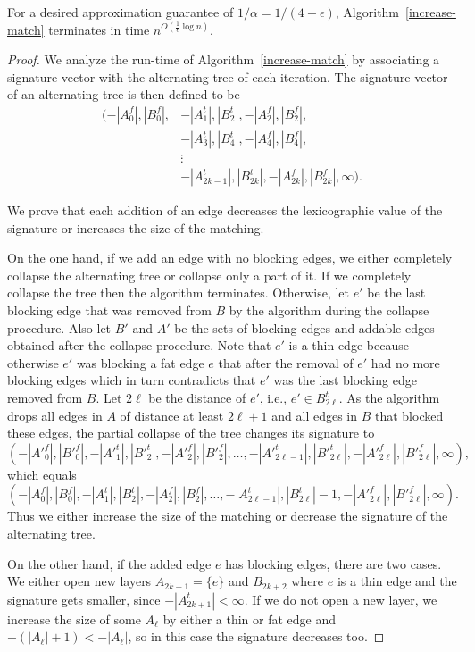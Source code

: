 \documentclass{llncs}
\begin{document}
\begin{lemma}
\label{lemma:termination}
For a desired approximation guarantee of $1/\alpha = 1/(4+\epsilon)$, Algorithm~\ref{increase-match} terminates in time
$n^{O\left(\frac{1}{\epsilon}\log n\right)}$.\end{lemma}
\begin{proof}
We analyze the run-time of Algorithm~\ref{increase-match} by
associating a signature vector with the alternating tree of each
iteration. The signature vector of an alternating tree is then defined to be
\begin{align*}
( -|A^f_0|, |B^f_0|, &-|A^t_1|, |B^t_2|,  -|A^f_2|, |B^f_2|, \\
&-|A^t_3|, |B^t_4|,  -|A^f_4|, |B^f_4|, \\
&  \vdots \\
& -|A^t_{2k-1}|, |B^t_{2k}|,  -|A^f_{2k}|, |B^f_{2k}|, \infty).
\end{align*}

We prove that each addition of an edge decreases the lexicographic value of
the signature or increases the size of the matching.

On the one hand, if we add an edge with no blocking edges, we either completely
collapse the alternating tree or collapse only a part of it.
If we completely collapse the tree then the algorithm terminates. Otherwise, let
$e'$ be the last blocking edge that was removed from $B$ by the algorithm during
the collapse procedure. Also let $B'$ and $A'$ be the sets of  blocking edges
and addable edges obtained after the collapse procedure. Note that $e'$ is a
thin edge because otherwise $e'$ was blocking a fat edge $e$ that after the
removal of $e'$ had no more blocking edges which in turn contradicts that $e'$
was the last blocking edge removed from $B$. Let $2\ell$ be the distance of
$e'$, i.e., $e' \in B^t_{2\ell}$. As the algorithm drops all edges in $A$ of
distance at least $2 \ell+1$ and all edges in $B$ that  blocked these edges, the
partial collapse of the tree changes its 
signature to $$( -|A'^f_0|, |B'^f_0|, -|A'^t_1|, |B'^t_2|,  -|A'^f_2|, |B'^f_2|, \dots, -|A'^t_{2\ell-1}|,
|B'^t_{2\ell}|,  -|A'^f_{2\ell}|, |B'^f_{2\ell}|, \infty),$$ which equals
$$( -|A^f_0|, |B^f_0|, -|A^t_1|, |B^t_2|,  -|A^f_2|, |B^f_2|, \dots, -|A^t_{2\ell-1}|,
|B^t_{2\ell}|-1,  -|A'^f_{2\ell}|, |B'^f_{2\ell}|, \infty).$$
Thus we either
increase the size of the matching or decrease the signature of the alternating
tree.

On the other hand, if the added edge $e$ has blocking edges, there are two
cases. We either open new layers $A_{2k+1}=\{e\}$ and $B_{2k+2}$ where $e$ is a
thin edge and the signature gets smaller, since $-|A^t_{2k+1}|<\infty$. If we do
not open a new layer, we increase the size of some $A_\ell$ by either a thin or fat edge and
$-(|A_\ell|+1)<-|A_\ell|$, so in this case the signature decreases too.


\end{proof}
\end{document}
